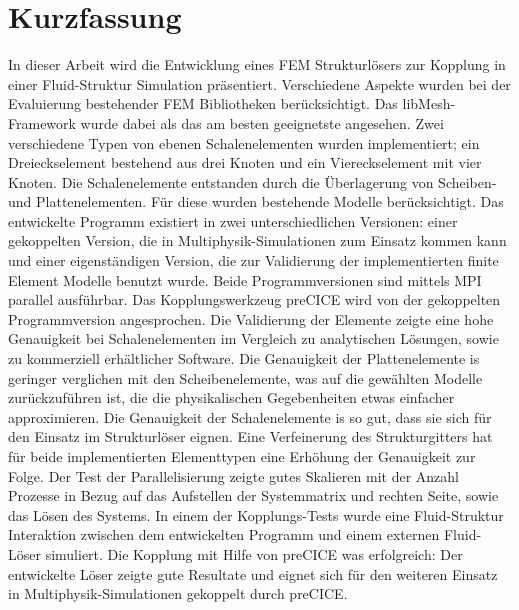 \cleardoublepage
\section*{Kurzfassung}
In dieser Arbeit wird die Entwicklung eines FEM Strukturlösers zur Kopplung in einer Fluid-Struktur Simulation präsentiert. Verschiedene Aspekte wurden bei der Evaluierung bestehender FEM Bibliotheken berücksichtigt. Das libMesh-Framework wurde dabei als das am besten geeignetste angesehen. Zwei verschiedene Typen von ebenen Schalenelementen wurden implementiert; ein Dreieckselement bestehend aus drei Knoten und ein Viereckselement mit vier Knoten. Die Schalenelemente entstanden durch die Überlagerung von Scheiben- und Plattenelementen. Für diese wurden bestehende Modelle berücksichtigt. Das entwickelte Programm existiert in zwei unterschiedlichen Versionen: einer gekoppelten Version, die in Multiphysik-Simulationen zum Einsatz kommen kann und einer eigenständigen Version, die zur Validierung der implementierten finite Element Modelle benutzt wurde. Beide Programmversionen sind mittels MPI parallel ausführbar. Das Kopplungswerkzeug preCICE wird von der gekoppelten Programmversion angesprochen. Die Validierung der Elemente zeigte eine hohe Genauigkeit bei Schalenelementen im Vergleich zu analytischen Lösungen, sowie zu kommerziell erhältlicher Software. Die Genauigkeit der Plattenelemente is geringer verglichen mit den Scheibenelemente, was auf die gewählten Modelle zurückzuführen ist, die die physikalischen Gegebenheiten etwas einfacher approximieren. Die Genauigkeit der Schalenelemente is so gut, dass sie sich für den Einsatz im Strukturlöser eignen. Eine Verfeinerung des Strukturgitters hat für beide implementierten Elementtypen eine Erhöhung der Genauigkeit zur Folge. Der Test der Parallelisierung zeigte gutes Skalieren mit der Anzahl Prozesse in Bezug auf das Aufstellen der Systemmatrix und rechten Seite, sowie das Lösen des Systems. In einem der Kopplungs-Tests wurde eine Fluid-Struktur Interaktion zwischen dem entwickelten Programm und einem externen Fluid-Löser simuliert. Die Kopplung mit Hilfe von preCICE was erfolgreich: Der entwickelte Löser zeigte gute Resultate und eignet sich für den weiteren Einsatz in Multiphysik-Simulationen gekoppelt durch preCICE.

